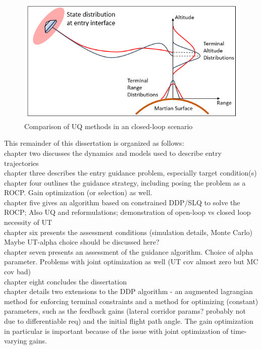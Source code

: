 \begin{figure}[h!]
	\centering
	\includegraphics[width=1\textwidth]{Images/RobustTrajectoryOptimization}
	\caption{Comparison of UQ methods in an closed-loop scenario}
	\label{Fig:RobustTrajectoryOpt}
\end{figure}

This remainder of this dissertation is organized as follows: \\
chapter two discusses the dynamics and models used to describe entry trajectories\\
chapter three describes the entry guidance problem, especially target condition(s)\\
chapter four outlines the guidance strategy, including posing the problem as a ROCP. Gain optimization (or selection) as well. \\
chapter five gives an algorithm based on constrained DDP/SLQ to solve the ROCP; Also UQ and reformulations; demonstration of open-loop vs closed loop necessity of UT \\
chapter six presents the assessment conditions (simulation details, Monte Carlo) Maybe UT-alpha choice should be discussed here?\\
chapter seven presents an assessment of the guidance algorithm. Choice of alpha parameter. Problems with joint optimization as well (UT cov almost zero but MC cov bad) \\
chapter eight concludes the dissertation \\

chapter details two extensions to the DDP algorithm - an augmented lagrangian method for enforcing terminal constraints and a method for optimizing (constant) parameters, such as the feedback gains (lateral corridor params? probably not due to differentiable req) and the initial flight path angle. The gain optimization in particular is important because of the issue with joint optimization of time-varying gains. 

